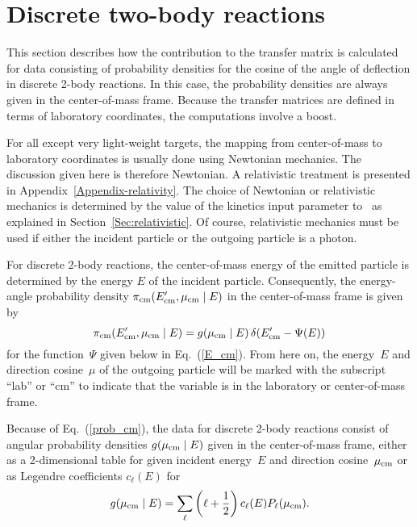 \chapter{Discrete two-body reactions}
\label{Sec:2-body}
This section describes how the contribution to the transfer matrix
is calculated for data consisting of probability densities for
the cosine of the angle of deflection in discrete 2-body reactions.
In this case, the probability densities are always given in 
the center-of-mass frame.
Because
the transfer matrices are defined in terms of laboratory
coordinates, the computations involve a boost.

For all except very light-weight targets, the mapping from
center-of-mass to laboratory coordinates is usually done using 
Newtonian mechanics.  The discussion given here is therefore
Newtonian.  A relativistic treatment is presented in Appendix~\ref{Appendix-relativity}.
The choice of Newtonian or relativistic mechanics is determined by
the value of the \textsf{kinetics} input parameter to \gettransfer\ as
explained in Section~\ref{Sec:relativistic}.  Of course, relativistic mechanics must
be used if either the incident particle or the outgoing particle is a
photon.

For discrete 2-body reactions,  the center-of-mass energy of the emitted particle
is determined by the energy $E$ of the incident particle.  Consequently, the
energy-angle probability density $\pi_{\text{cm}}(E_{\text{cm}}', \mu_{\text{cm}} \mid E)$ in the
center-of-mass frame is given by
\begin{equation}
  \pi_{\text{cm}}(E_{\text{cm}}', \mu_{\text{cm}} \mid E) =
  g( \mu_{\text{cm}} \mid  E) \, \delta( E_{\text{cm}}' - \Psi( E ) )
  \label{prob_cm}
\end{equation}
for the function~$\Psi$ given below in Eq.~(\ref{E_cm}).  
From here on, the energy~$E$ and direction cosine~$\mu$
of the outgoing particle will be marked with the subscript ``lab'' or ``cm'' to
indicate that the variable is in the laboratory or center-of-mass frame.

Because of Eq.~(\ref{prob_cm}), the data for discrete 2-body reactions consist
of angular probability densities $g( \mu_{\text{cm}} \mid E)$ given in the 
center-of-mass frame, either as a 2-dimensional table 
for given incident energy~$E$ and direction cosine~$\mu_{\text{cm}}$
or as Legendre coefficients $c_\ell(E)$ for
\begin{equation}
  g( \mu_{\text{cm}} \mid  E) =
  \sum_\ell 
  \left(
     \ell + \frac{1}{2}
  \right)
    c_\ell(E)P_\ell( \mu_{\text{cm}} ).
  \label{cmLegendre}
\end{equation}

